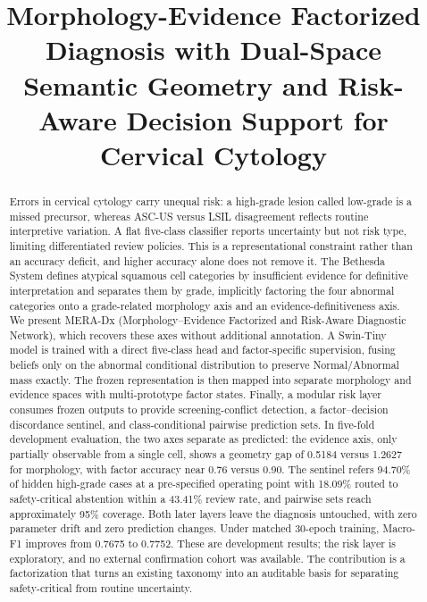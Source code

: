 \documentclass[conference]{IEEEtran}
\begin{document}
\title{Morphology-Evidence Factorized Diagnosis with Dual-Space Semantic Geometry and Risk-Aware Decision Support for Cervical Cytology}

\author{}

\maketitle

\begin{abstract}
Errors in cervical cytology carry unequal risk: a high-grade lesion called
low-grade is a missed precursor, whereas ASC-US versus LSIL disagreement
reflects routine interpretive variation. A flat five-class classifier reports
uncertainty but not risk type, limiting differentiated review policies. This is
a representational constraint rather than an accuracy deficit, and higher
accuracy alone does not remove it. The Bethesda System defines atypical squamous
cell categories by insufficient evidence for definitive interpretation and
separates them by grade, implicitly factoring the four abnormal categories onto
a grade-related morphology axis and an evidence-definitiveness axis. We present
MERA-Dx (Morphology--Evidence Factorized and Risk-Aware Diagnostic Network),
which recovers these axes without additional annotation. A Swin-Tiny model is
trained with a direct five-class head and factor-specific supervision, fusing
beliefs only on the abnormal conditional distribution to preserve
Normal/Abnormal mass exactly. The frozen representation is then mapped into
separate morphology and evidence spaces with multi-prototype factor states.
Finally, a modular risk layer consumes frozen outputs to provide
screening-conflict detection, a factor--decision discordance sentinel, and
class-conditional pairwise prediction sets. In five-fold development evaluation,
the two axes separate as predicted: the evidence axis, only partially observable
from a single cell, shows a geometry gap of 0.5184 versus 1.2627 for morphology,
with factor accuracy near 0.76 versus 0.90. The sentinel refers 94.70\% of
hidden high-grade cases at a pre-specified operating point with 18.09\% routed
to safety-critical abstention within a 43.41\% review rate, and pairwise sets
reach approximately 95\% coverage. Both later layers leave the diagnosis
untouched, with zero parameter drift and zero prediction changes. Under matched
30-epoch training, Macro-F1 improves from 0.7675 to 0.7752. These are
development results; the risk layer is exploratory, and no external confirmation
cohort was available. The contribution is a factorization that turns an existing
taxonomy into an auditable basis for separating safety-critical from routine
uncertainty.
\end{abstract}
\end{document}
